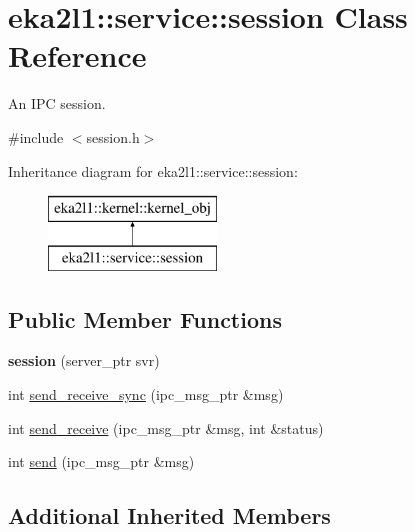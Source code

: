 \hypertarget{classeka2l1_1_1service_1_1session}{}\section{eka2l1\+:\+:service\+:\+:session Class Reference}
\label{classeka2l1_1_1service_1_1session}


An I\+PC session.  




{\ttfamily \#include $<$session.\+h$>$}

Inheritance diagram for eka2l1\+:\+:service\+:\+:session\+:\begin{figure}[H]
\begin{center}
\leavevmode
\includegraphics[height=2.000000cm]{classeka2l1_1_1service_1_1session}
\end{center}
\end{figure}
\subsection*{Public Member Functions}
\begin{DoxyCompactItemize}
\item 
\mbox{\label{classeka2l1_1_1service_1_1session_a4ba9b64f89f3fba68f52a6f8febc601a}} 
{\bfseries session} (server\+\_\+ptr svr)
\item 
int \mbox{\hyperlink{classeka2l1_1_1service_1_1session_a54de54e7b2381b4a0780669d731cef4d}{send\+\_\+receive\+\_\+sync}} (ipc\+\_\+msg\+\_\+ptr \&msg)
\item 
int \mbox{\hyperlink{classeka2l1_1_1service_1_1session_ab1c2c7f662a47b7727935e29d4e3a7ba}{send\+\_\+receive}} (ipc\+\_\+msg\+\_\+ptr \&msg, int \&status)
\item 
int \mbox{\hyperlink{classeka2l1_1_1service_1_1session_a03c16b770ef9cfafec551263b3a9854b}{send}} (ipc\+\_\+msg\+\_\+ptr \&msg)
\end{DoxyCompactItemize}
\subsection*{Additional Inherited Members}


